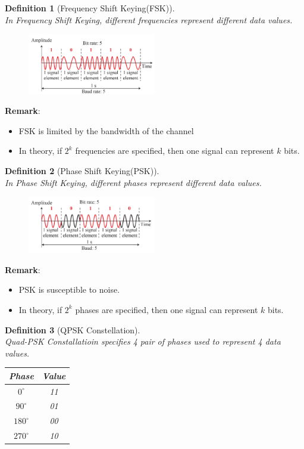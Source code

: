 \documentclass[12pt]{article}
\newtheorem{definition}{Definition}[section]
\theoremstyle{definition}
\begin{document}
\begin{definition}[Frequency Shift Keying(FSK)]
\hfill\\\normalfont In Frequency Shift Keying, different frequencies represent different data values.
\begin{figure}[h]
\centering
\includegraphics[width=0.5\textwidth]{10_2_2.png}
\end{figure}
\end{definition}
\textbf{Remark}:
\begin{itemize}
  \item FSK is limited by the bandwidth of the channel
  \item In theory, if $2^k$ frequencies are specified, then one signal can represent $k$ bits.
\end{itemize}
\begin{definition}[Phase Shift Keying(PSK)]
\hfill\\\normalfont In Phase Shift Keying, different phases represent different data values.
\begin{figure}[h]
\centering
\includegraphics[width = 0.5\textwidth]{10_2_3.png}
\end{figure}
\end{definition}
\textbf{Remark}:
\begin{itemize}
  \item PSK is susceptible to noise.
  \item In theory, if $2^k$ phases are specified, then one signal can represent $k$ bits.
\end{itemize}
\begin{definition}[QPSK Constellation]
\hfill\\\normalfont Quad-PSK Constallatioin specifies 4 pair of phases used to represent 4 data values.
\begin{table}[h]
\centering
\begin{tabular}{|c|c|}
\hline
Phase&Value\\\hline
$0^\circ$&11\\\hline
$90^\circ$&01\\\hline
$180^\circ$&00\\\hline
$270^\circ$&10\\\hline
\end{tabular}
\end{table}
\end{definition}
\end{document}
